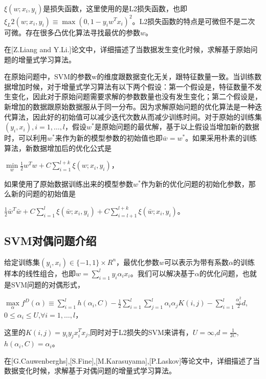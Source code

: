 \documentclass[master]{njuthesis}
\begin{document}
    $\xi\left(w;x_i,y_i\right)$是损失函数，这里使用的是L2损失函数，也即$\xi_L2\left(w;x_i,y_i\right) \equiv \max\left(0,1-y_iw^Tx_i\right)^2$。L2损失函数的特点是可微但不是二次可微。存在很多凸优化算法寻找最优的参数$w$。

   在[Z.Liang and Y.Li.]\cite{Primal2009}论文中，详细描述了当数据发生变化时候，求解基于原始问题的增量式学习算法。
  
   在原始问题中，SVM的参数w的维度跟数据变化无关，跟特征数量一致。当训练数据增加时候，对于增量式学习算法有以下两个假设：第一个假设是，特征数量不发生变化，因此对于原始问题需要求解的参数数量也没有发生变化；第二个假设是，新增加的数据跟原始数据服从于同一分布。因为求解原始问题的优化算法是一种迭代算法，因此好的初始值可以减少迭代次数从而减少训练时间。对于原始的训练集$\left(y_i,x_i\right),i=1,\dots,l$，假设$w^*$是原始问题的最优解，基于以上假设当增加新的数据时，可以利用$w^*$来作为新的模型参数的初始值也即$\bar{w}=w^*$。如果采用朴素的训练算法，新数据增加后的优化公式是

    $\min\limits_{w} \frac{1}{2}w^Tw+C\sum_{i=1}^{l+k} \xi\left(w;x_i,y_i\right)$，

    如果使用了原始数据训练出来的模型参数$w^\ast$作为新的优化问题的初始化参数，那么新的问题的初始值是

    $\frac{1}{2}\bar{w}^T\bar{w}+C\sum_{i=1}^l
\xi\left(\bar{w};x_i,y_i\right)+C\sum_{i=l+1}^{l+k}\xi\left(\bar{w};x_i,y_i\right)$。

\subsection{SVM对偶问题介绍}
    
    给定训练集$\left(y_i,x_i\right) \in \{-1,1\} \times R^n$，最优化参数$w$可以表示为带有系数$\alpha$的训练样本的线性组合，也即$w=\sum_{i=1}^l y_i\alpha_ix_i$。我们可以解决基于$\alpha$的优化问题，也就是SVM问题的对偶形式，

    $\max\limits_{\alpha} f^D\left(\alpha\right) \equiv \sum_{i=1}^l h\left(\alpha_i,C\right)-\frac{1}{2}\sum_{i=1}^l \sum_{j=1}^l \alpha_i\alpha_j K\left(i,j\right)-\sum_{i=1}^l \frac{\alpha_i^2}{2}d$,$0 \le \alpha_i \le U$,$\forall i=1,\dots,l$，

    这里的$K\left(i,j\right)=y_iy_jx^T_ix_j$,同时对于L2损失的SVM来讲有，$U=\infty$,$d=\frac{1}{2C}$,$h\left(\alpha_i,C\right)=\alpha_i$。
    
    在[G.Cauwenberghs]\cite{NIPS20011},[S.Fine]\cite{NIPS20012},[M.Karasuyama]\cite{TNN2010},[P.Laskov]\cite{JMLR2006}等论文中，详细描述了当数据变化时候，求解基于对偶问题的增量式学习算法。
    
\end{document}
